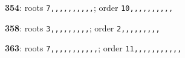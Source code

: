 \noindent \textbf{354}: roots \texttt{7,,,,,,,,,,}; order \texttt{10,,,,,,,,,,}\par
\noindent \textbf{358}: roots \texttt{3,,,,,,,,,}; order \texttt{2,,,,,,,,,}\par
\noindent \textbf{363}: roots \texttt{7,,,,,,,,,,,}; order \texttt{11,,,,,,,,,,,}\par
